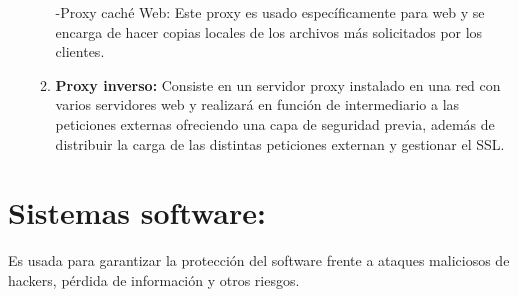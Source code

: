 \begin{enumerate}
\begin{enumerate}
-Proxy caché Web: Este proxy es usado específicamente para web y se encarga de hacer copias locales de los archivos más solicitados por los clientes.
\item {\bfseries Proxy inverso:}
 Consiste en un servidor proxy instalado en una red con varios servidores web y realizará en función de intermediario a las peticiones externas ofreciendo una capa de seguridad previa, además de distribuir la carga de las distintas peticiones externan y gestionar el SSL.
\end{enumerate}
\end{enumerate}
\section{Sistemas software:}
Es usada para garantizar la protección del software frente a ataques maliciosos de hackers, pérdida de información y otros riesgos.







\nocite{ransomware}
\nocite{sql_injection}
\nocite{vulnerabilidades}
\nocite{vulnerabilidades2}
\nocite{wikip}
\nocite{comision_europea}
\nocite{isot}
\nocite{gestion_activos}
\nocite{incibe2}
\nocite{herramientas-evaluacion-riesgos}
\nocite{bibdigital}
\nocite{bibdigital}

\nocite{xss2}
\nocite{pri}





